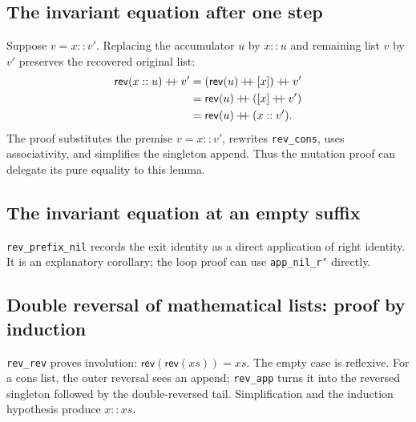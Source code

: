 \documentclass[11pt]{article}
\begin{document}
\subsection{The invariant equation after one step}

\begin{minipage}{\linewidth}

\end{minipage}

Suppose \(v=x::v'\). Replacing the accumulator \(u\) by \(x::u\) and
remaining list \(v\) by \(v'\) preserves the recovered original list:
\[
\begin{aligned}
\mathsf{rev}(x::u)\mathbin{+\mkern-6mu+}v'
 &= (\mathsf{rev}(u)\mathbin{+\mkern-6mu+}[x])
       \mathbin{+\mkern-6mu+}v'\\
 &= \mathsf{rev}(u)\mathbin{+\mkern-6mu+}([x]\mathbin{+\mkern-6mu+}v')\\
 &= \mathsf{rev}(u)\mathbin{+\mkern-6mu+}(x::v').
\end{aligned}
\]
The proof substitutes the premise \(v=x::v'\), rewrites \texttt{rev\_cons},
uses associativity, and simplifies the singleton append. Thus the mutation
proof can delegate its pure equality to this lemma.
\subsection{The invariant equation at an empty suffix}

\begin{minipage}{\linewidth}

\end{minipage}

\texttt{rev\_prefix\_nil} records the exit identity as a direct application of
right identity. It is an explanatory corollary; the loop proof can use
\texttt{app\_nil\_r'} directly.

\subsection{Double reversal of mathematical lists: proof by induction}

\begin{minipage}{\linewidth}

\end{minipage}

\texttt{rev\_rev} proves involution:
\(\mathsf{rev}(\mathsf{rev}(xs))=xs\). The empty case is reflexive.
For a cons list, the outer reversal sees an append; \texttt{rev\_app} turns it
into the reversed singleton followed by the double-reversed tail. Simplification
and the induction hypothesis produce \(x::xs\).
\end{document}
